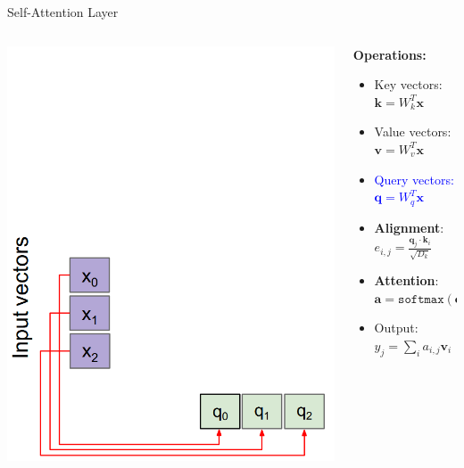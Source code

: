 \documentclass[serif, aspectratio=169]{beamer}
\begin{document}
\begin{frame}{Self-Attention Layer}
		\begin{columns}
			\begin{column}{0.25\textwidth}
				\centering
				\includegraphics[width=\textwidth]{pic/self-attention-s.png} 
				\vspace{0.5em}
			\end{column}
			
			\begin{column}{0.44\textwidth}
				
				\textbf{Operations:}
				\begin{itemize}
					\item Key vectors: $\mathbf{k} = W_k^T \mathbf{x}$
					\item Value vectors: $\mathbf{v} = W_v^T \mathbf{x}$
					\item \textcolor{blue}{Query vectors: $\mathbf{q} = W_q^T \mathbf{x}$}
					\item \textbf{Alignment}: $e_{i,j} = \frac{\mathbf{q}_j \cdot \mathbf{k}_i}{\sqrt{D_k}}$
					\item \textbf{Attention}: $\mathbf{a} = \texttt{softmax}(\mathbf{e})$
					\item Output: $y_j = \sum_i a_{i,j} \mathbf{v}_i$
				\end{itemize}
				

\end{column}
\end{columns}
\end{frame}
\end{document}
